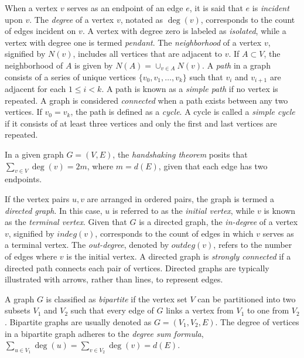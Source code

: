 When a vertex $v$ serves as an endpoint of an edge $e$, it is said that $e$ is \emph{incident} upon $v$. The \emph{degree} of a vertex $v$, notated as $\deg(v)$, corresponds to the count of edges incident on $v$. A vertex with degree zero is labeled as \emph{isolated}, while a vertex with degree one is termed \emph{pendant}. The \emph{neighborhood} of a vertex $v$, signified by $N(v)$, includes all vertices that are adjacent to $v$. If $A \subset V$, the neighborhood of $A$ is given by $N(A) = \cup_{v \in A} N(v)$. A \emph{path} in a graph consists of a series of unique vertices $\{v_{0}, v_{1}, \ldots ,v_{k}\}$ such that $v_{i}$ and $v_{i+1}$ are adjacent for each $1 \leq i < k$. A path is known as a \emph{simple path} if no vertex is repeated. A graph is considered \emph{connected} when a path exists between any two vertices. If $v_{0} = v_{k}$, the path is defined as a \emph{cycle}. A cycle is called a \emph{simple cycle} if it consists of at least three vertices and only the first and last vertices are repeated. 

\begin{example}
In a given graph $G=(V,E)$, the \emph{handshaking theorem} posits that $\sum_{v \in V} \deg(v) = 2m$, where $m = d(E)$, given that each edge has two endpoints.
\end{example}

If the vertex pairs $u, v$ are arranged in ordered pairs, the graph is termed a \emph{directed graph}. In this case, $u$ is referred to as the \emph{initial vertex}, while $v$ is known as the \emph{terminal vertex}. Given that $G$ is a directed graph, the \emph{in-degree} of a vertex $v$, signified by $indeg(v)$, corresponds to the count of edges in which $v$ serves as a terminal vertex. The \emph{out-degree}, denoted by $outdeg(v)$, refers to the number of edges where $v$ is the initial vertex. A directed graph is \emph{strongly connected} if a directed path connects each pair of vertices. Directed graphs are typically illustrated with arrows, rather than lines, to represent edges.

A graph $G$ is classified as \emph{bipartite} if the vertex set $V$ can be partitioned into two subsets $V_1$ and $V_2$ such that every edge of $G$ links a vertex from $V_1$ to one from $V_2$. Bipartite graphs are usually denoted as $G=(V_1, V_2, E)$. The degree of vertices in a bipartite graph adheres to the \emph{degree sum formula}, $\sum_{u \in V_1} \deg(u) = \sum_{v \in V_2} \deg(v) = d(E)$.

